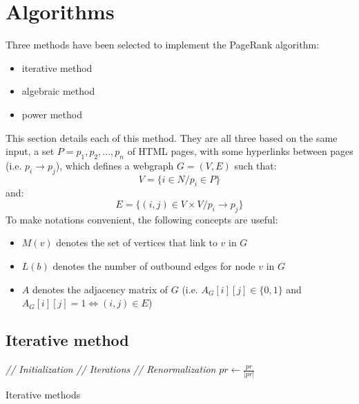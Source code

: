 \documentclass[pdftex,12pt,a4paper]{article}
\begin{document}
\section{Algorithms}

Three methods have been selected to implement the PageRank algorithm:
\begin{itemize}
\item iterative method
\item algebraic method
\item power method
\end{itemize}
This section details each of this method. They are all three based on the same input, a set $P = p_1, p_2, ..., p_n$ of HTML pages, with some hyperlinks between pages (i.e. $p_i \rightarrow p_j$), which defines a webgraph $G = \left(V, E\right)$ such that:
$$V = \{i \in N / p_i \in P\}$$
and:
$$E = \{\left(i, j\right) \in V \times V / p_i \rightarrow p_j\}$$
To make notations convenient, the following concepts are useful:
\begin{itemize}
\item $M\left(v\right)$ denotes the set of vertices that link to $v$ in $G$
\item $L\left(b\right)$ denotes the number of outbound edges for node $v$ in $G$
\item $A$ denotes the adjacency matrix of $G$ (i.e. $A_G\left[i\right]\left[j\right] \in \{0, 1\}$ and $A_G\left[i\right]\left[j\right] = 1 \Leftrightarrow \left(i, j\right) \in E$)
\end{itemize}

\subsection{Iterative method}
\IncMargin{1em}
\begin{algorithm}[H]
\BlankLine
\Indm
{}
\Indp
\BlankLine
\emph{// Initialization}\;
\emph{// Iterations}\;
\emph{// Renormalization}\;
$pr\leftarrow\frac{pr}{|pr|}$\;
\BlankLine
\caption{Iterative methods}\label{algo_iterative_method}
\end{algorithm}
\DecMargin{1em}
\end{document}
